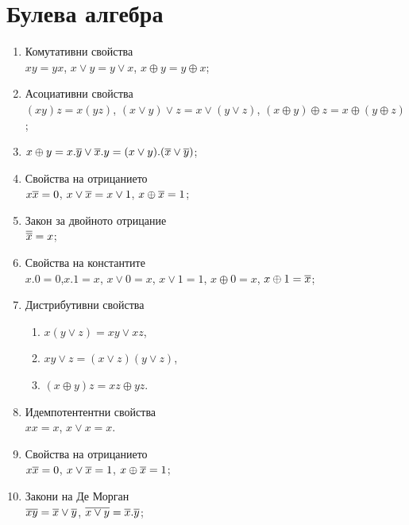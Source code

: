 \section{Булева алгебра}

\begin{enumerate}[1)]%
\item
  Комутативни свойства\\
  $xy = yx$, $x\vee y = y\vee x$, $x\oplus y = y\oplus x$;
\item
  Асоциативни свойства\\
  $(xy)z = x(yz)$, $(x\vee y)\vee z = x\vee (y\vee z)$, $(x\oplus y)\oplus z = x\oplus (y\oplus z)$;
\item
  $x\oplus y = x.\overline{y}\vee \overline{x}.y = (x\vee y).(\overline{x}\vee\overline{y})$;
\item
  Свойства на отрицанието\\
  $x\overline{x} = 0$, $x\vee\overline{x} = x\vee 1$, $x\oplus\overline{x} = 1$;
\item
  Закон за двойното отрицание\\
  $\overline{\overline{x}} = x$;
\item
  Свойства на константите\\
  $x.0 = 0$,$x.1 = x$, $x\vee 0 = x$, $x\vee 1 = 1$, $x\oplus 0 = x$, $x\oplus 1 = \overline{x}$;
\item
  Дистрибутивни свойства
  \begin{enumerate}[]
  \item
    $x(y\vee z) = xy \vee xz$,
  \item
    $xy \vee z = (x\vee z)(y\vee z)$,
  \item
    $(x\oplus y)z = xz \oplus yz$.
  \end{enumerate}
\item
  Идемпотентентни свойства\\
  $xx = x$, $x\vee x = x$.
\item
  Свойства на отрицанието\\
  $x\overline{x} = 0$, $x\vee\overline{x} = 1$, $x\oplus\overline{x} = 1$;
\item
  Закони на Де Морган\\
  $\overline{xy} = \overline{x}\vee\overline{y}$, $\overline{x\vee y} = \overline{x}.\overline{y}$;
\end{enumerate}

